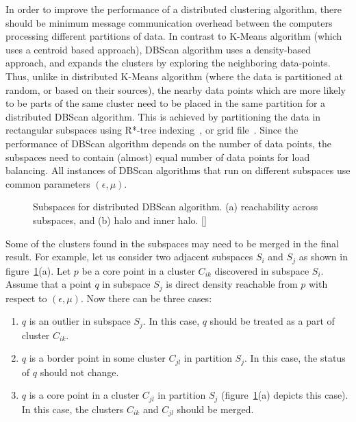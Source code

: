 In order to improve the performance of a distributed clustering algorithm, there should be minimum message communication overhead
between the computers processing different partitions of data. In contrast to K-Means algorithm (which uses a centroid based approach),
DBScan algorithm uses a density-based approach, and expands the clusters by exploring the neighboring data-points. Thus, unlike in
distributed K-Means algorithm (where the data is partitioned at random, or based on their sources), the nearby data points which are 
more likely to be parts of the same cluster need to be placed in the same partition for a distributed DBScan algorithm. 
This is achieved by partitioning the data in rectangular subspaces using R*-tree indexing~\citep{Beckmann:1990}, or grid 
file~\citep{Nievergelt:1984}.  Since the performance of DBScan algorithm depends on the number of data points, the subspaces need to 
contain (almost) equal number of data points for load balancing.  All instances of DBScan algorithms that run on different subspaces
use common parameters $(\epsilon,\mu)$. 

\begin{figure}[htbp!]
	\caption{Subspaces for distributed DBScan algorithm. (a) reachability across subspaces, and (b) halo and inner halo.
		[]}
	\label{fig:bigdata:subspace}
\end{figure}

Some of the clusters found in the subspaces may need to be merged in the final result. For example, let us consider two adjacent 
subspaces $S_i$ and $S_j$ as shown in figure~\ref{fig:bigdata:subspace}(a). Let $p$ be a core point in a cluster $C_{ik}$ discovered in 
subspace $S_i$. Assume that a point $q$ in subspace $S_j$ is direct density reachable from $p$ with respect to $(\epsilon,\mu)$. 
Now there can be three cases:

\begin{enumerate}
	\item $q$ is an outlier in subspace $S_j$. In this case, $q$ should be treated as a part of cluster $C_{ik}$.
	\item $q$ is a border point in some cluster $C_{jl}$ in partition $S_j$. In this case, the status of $q$ should not change.
	\item $q$ is a core point in a cluster $C_{jl}$ in partition $S_j$ (figure~\ref{fig:bigdata:subspace}(a) depicts this case). 
		In this case, the clusters $C_{ik}$ and $C_{jl}$ should be merged.
\end{enumerate}

